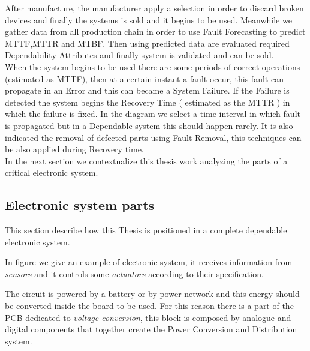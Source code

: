 {{{			After manufacture, the manufacturer apply a selection in order to discard broken devices and finally the systems is sold and it begins to be used.
			Meanwhile we gather data from all production chain in order to use Fault Forecasting to predict MTTF,MTTR and MTBF. Then using predicted data are evaluated required Dependability Attributes and finally system is validated and can be sold.\\
			
			When the system begins to be used there are some periods of correct operations (estimated as MTTF), then at a certain instant a fault occur, this fault can propagate in an Error and this can became a System Failure.
			If the Failure is detected the system begins the Recovery Time ( estimated as the MTTR ) in which the failure is fixed. In the diagram we select a time interval in which fault is propagated but in a Dependable system this should happen rarely. 
			It is also indicated the removal of defected parts using Fault Removal, this techniques can be also applied during Recovery time.  \\
			     
			In the next section we contextualize this thesis work analyzing the parts of a critical electronic system.
		} %
	
		\newpage
		\subsection{Electronic system parts}{
		    \label{ElectronicSystemParts}
			This section describe how this Thesis is positioned in a complete dependable electronic system.
			
			In figure  we give an example of electronic system, it receives information from \textit{sensors} and it controls some \textit{actuators} according to their specification. 
			
			The circuit is powered by a battery or by power network and this energy should be converted inside the board to be used. For this reason there is a part of the PCB dedicated to \textit{voltage conversion}, this block is composed by analogue and digital components that together create the Power Conversion and Distribution system.
			
}}}
